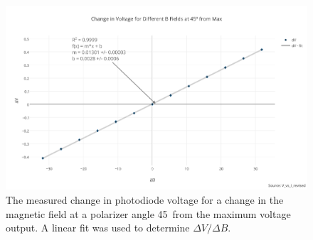 \documentclass[prb,preprint]{revtex4-1}
\begin{document}
{\begin{figure}[b]
\includegraphics[width =6.3in]{change_in_voltage_for_different_b_fields_at_45_from_max.pdf}
\caption{\label{method2pic} The measured change in photodiode voltage for a change in the magnetic field at a polarizer angle 45\degree\  from the maximum voltage output. A linear fit was used to determine $\Delta V/\Delta B$.}
\end{figure}
}
\end{document}

